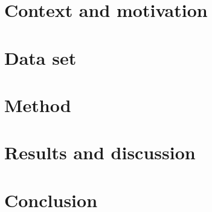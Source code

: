\documentclass[11pt]{article}
\begin{document}

\pagebreak{}


\tableofcontents
{}
\setcounter{page}{2}
\pagebreak{}

\listoffigures
\listoftables
\pagebreak{}


\setcounter{page}{1}


\section{Context and motivation}



\section{Data set}



\section{Method}



\section{Results and discussion}


\newpage
\section{Conclusion}



\newpage


\end{document}
